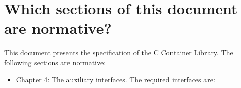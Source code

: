 \section{Which sections of this document are normative?}
This document presents the specification of the C Container Library. The following sections are normative:
\begin{itemize}
\item Chapter 4: The auxiliary interfaces. The required interfaces are:


\end{itemize}
